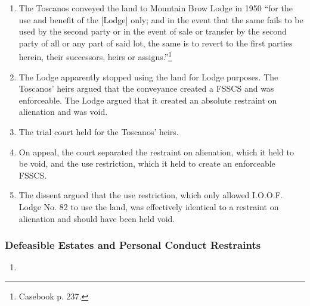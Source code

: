 \begin{enumerate}
    \item The Toscanos conveyed the land to Mountain Brow Lodge in 1950 ``for 
    the use and benefit of the [Lodge] only; and in the event that the same 
    fails to be used by the second party or in the event of sale or transfer 
    by the second party of all or any part of said lot, the same is to revert 
    to the first parties herein, their successors, heirs or 
    assigns.''\footnote{Casebook p. 237.}
    \item The Lodge apparently stopped using the land for Lodge purposes. The 
    Toscanos' heirs argued that the conveyance created a FSSCS and was 
    enforceable. The Lodge argued that it created an absolute restraint on 
    alienation and was void.
    \item The trial court held for the Toscanos' heirs.
    \item On appeal, the court separated the restraint on alienation, which it 
    held to be void, and the use restriction, which it held to create an 
    enforceable FSSCS.
    \item The dissent argued that the use restriction, which only allowed 
    I.O.O.F. Lodge No. 82 to use the land, was effectively identical to a 
    restraint on alienation and should have been held void.
\end{enumerate}

\subsubsection{Defeasible Estates and Personal Conduct Restraints}

\begin{enumerate}
    \item %
\end{enumerate}

